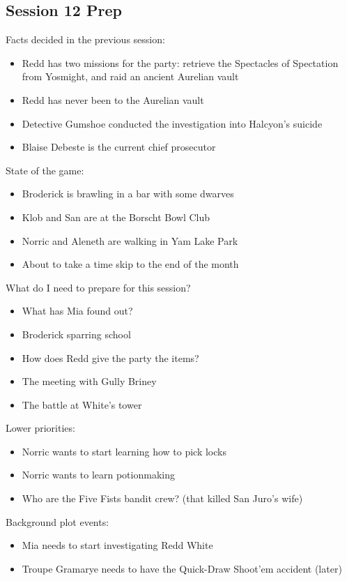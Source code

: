 \subsection{Session 12 Prep}

Facts decided in the previous session:
\begin{itemize}
\item Redd has two missions for the party: retrieve the Spectacles of Spectation from Yosmight, and raid an ancient Aurelian vault
\item Redd has never been to the Aurelian vault
\item Detective Gumshoe conducted the investigation into Halcyon's suicide
\item Blaise Debeste is the current chief prosecutor
\end{itemize}

State of the game:
\begin{itemize}
\item Broderick is brawling in a bar with some dwarves
\item Klob and San are at the Borscht Bowl Club
\item Norric and Aleneth are walking in Yam Lake Park
\item About to take a time skip to the end of the month
\end{itemize}

What do I need to prepare for this session?
\begin{itemize}
\item What has Mia found out?
\item Broderick sparring school
\item How does Redd give the party the items?
\item The meeting with Gully Briney
\item The battle at White's tower
\end{itemize}

Lower priorities:
\begin{itemize}
\item Norric wants to start learning how to pick locks
\item Norric wants to learn potionmaking
\item Who are the Five Fists bandit crew? (that killed San Juro's wife)
\end{itemize}

Background plot events:
\begin{itemize}
\item Mia needs to start investigating Redd White
\item Troupe Gramarye needs to have the Quick-Draw Shoot'em accident (later)
\end{itemize}

